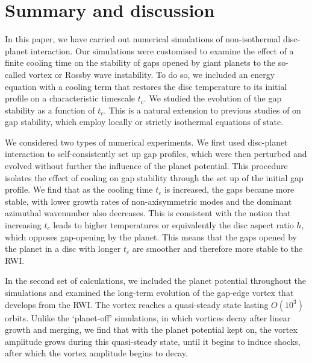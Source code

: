 \section{Summary and discussion}\label{summary}
In this paper, we have carried out numerical simulations of
non-isothermal disc-planet interaction.  
Our simulations were customised to examine the effect of a finite 
cooling time on the stability of gaps  
opened by giant planets to the so-called vortex or Rossby wave
instability. To do so, we  
included an energy equation with a cooling term that restores the 
disc temperature to its initial profile on a characteristic timescale
$t_c$. We studied the evolution of the gap stability as a function of 
$t_c$. This is a natural extension to previous studies of on gap
stability, which employ locally or strictly isothermal equations of
state.   	

We considered two types of numerical experiments. We first used
disc-planet interaction to self-consistently set up gap profiles,
which were then perturbed and evolved without further the influence of
the planet potential. This procedure isolates the effect of cooling on
gap stability through the set up of the initial gap profile. We find
that as the cooling time $t_c$ is increased, the gaps became more
stable, with lower growth rates of non-axisymmetric modes and the
dominant azimuthal wavenumber also decreases. This is consistent with
the notion that increasing $t_c$ leads to higher temperatures or
equivalently the disc aspect ratio $h$,
which opposes gap-opening by the planet. This means that the gaps
opened by the planet in a disc with longer $t_c$ are smoother and
therefore  more stable to the RWI. %


In the second set of calculations, we included the planet potential
throughout the simulations  and examined the long-term evolution of
the gap-edge vortex that develops from the RWI. The vortex reaches 
a quasi-steady state lasting $O(10^3)$ orbits. Unlike the `planet-off'
simulations, in which vortices decay after linear growth and merging,
we find that with the planet potential kept on, the vortex amplitude
grows during this quasi-steady state, until it begins to induce
shocks, after which the vortex amplitude begins to decay.   

